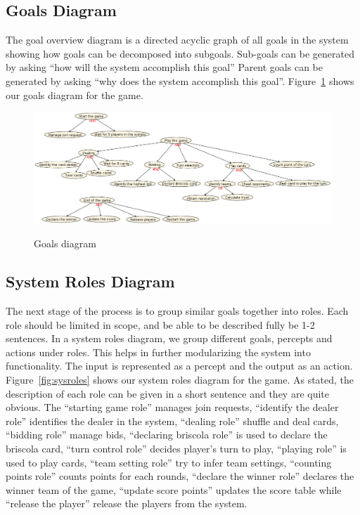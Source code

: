 \documentclass[a4paper]{article}
\begin{document}
\subsection{Goals Diagram}

The goal overview diagram is a directed acyclic graph of all goals in the system showing how goals can be decomposed into subgoals. Sub-goals can be generated by asking ``how will the system accomplish this goal'' Parent goals can be generated by asking ``why does the system accomplish this goal''. Figure~\ref{fig:goals} shows our goals diagram for the game.

\begin{figure}[htp]
  \includegraphics[keepaspectratio,scale=0.4]{pdt/images/system_specification/goal_overview.png}
  \label{fig:goals}
  \caption{Goals diagram}
\end{figure}
  
\subsection{System Roles Diagram}

The next stage of the process is to group similar goals together into roles. Each role should be limited in scope, and be able to be described fully be 1-2 sentences. In a system roles diagram, we group different goals, percepts and actions under roles. This helps in further modularizing the system into functionality. The input is represented as a percept and the output as an action. Figure~\ref{fig:sysroles} shows our system roles diagram for the game. As stated, the description of each role can be given in a short sentence and they are quite obvious. The ``starting game role'' manages join requests, ``identify the dealer role'' identifies the dealer in the system, ``dealing role'' shuffle and deal cards, ``bidding role'' manage bids, ``declaring briscola role'' is used to declare the briscola card, ``turn control role'' decides player's turn to play, ``playing role'' is used to play cards, ``team setting role'' try to infer team settings, ``counting points role'' counts points for each rounds, ``declare the winner role'' declares the winner team of the game, ``update score points'' updates the score table while ``release the player'' release the players from the system. 
\end{document}
